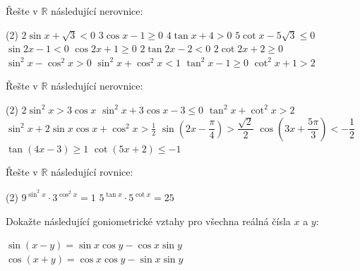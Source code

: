 \documentclass[12pt,a4paper]{article}
\begin{document}
\begin{exercise}
    Řešte v $\mathbb{R}$ následující nerovnice:
    \begin{tasks}(2)
        \task $2 \sin x + \sqrt{3} < 0$
        \task $3 \cos x - 1 \ge 0$
        \task $4 \tan x + 4 > 0$
        \task $5 \cot x - 5\sqrt{3} \le 0$
        \task $\sin 2x - 1 < 0$
        \task $\cos 2x + 1 \ge 0$
        \task $2 \tan 2x - 2 < 0$
        \task $2 \cot 2x + 2 \ge 0$
        \task $\sin^2 x - \cos^2 x > 0$
        \task $\sin^2 x + \cos^2 x < 1$
        \task $\tan^2 x - 1 \ge 0$
        \task $\cot^2 x + 1 > 2$
    \end{tasks}
\end{exercise}


\begin{exercise}
    Řešte v $\mathbb{R}$ následující nerovnice:
    \begin{tasks}(2)
        \task $2 \sin^2 x > 3 \cos x$
        \task $\sin^2 x + 3 \cos x - 3 \le 0$
        \task $\tan^2 x + \cot^2 x > 2$
        \task $\sin^2 x + 2 \sin x \cos x + \cos^2 x > \frac{1}{2}$
        \task $\sin \left(2x - \dfrac{\pi}{4}\right) > \dfrac{\sqrt{2}}{2}$
        \task $\cos \left(3x + \dfrac{5\pi}{3}\right) < -\dfrac{1}{2}$
        \task $\tan \left(4x - 3\right) \ge 1$
        \task $\cot \left(5x + 2\right) \le -1$
    \end{tasks}
\end{exercise}


\begin{exercise}
    Řešte v $\mathbb{R}$ následující rovnice:
    \begin{tasks}(2)
        \task $9^{\sin^2 x} \cdot 3^{\cos^2 x} = 1$
        \task $5^{\tan x} \cdot 5^{\cot x} = 25$

    \end{tasks}
    
\end{exercise}


\begin{exercise}
    Dokažte následující goniometrické vztahy pro všechna reálná čísla $x$ a $y$:
    \begin{tasks}
        \task $\sin (x - y) = \sin x \cos y - \cos x \sin y$
        \task $\cos (x + y) = \cos x \cos y - \sin x \sin y$
    \end{tasks}
\end{exercise}
\end{document}
